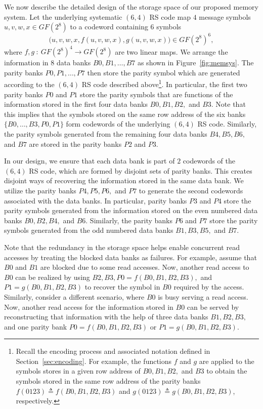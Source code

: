 We now describe the detailed design of the storage space of our proposed memory system. Let the underlying systematic $(6,4)$ RS code map $4$ message symbols $u, v, w, x \in GF(2^{8})$ to a codeword containing $6$ symbols 
$$
\big(u, v, w, x, f(u, v, w, x), g(u, v, w, x)\big) \in GF(2^{8})^6,
$$
where $f, g~:~GF(2^{8})^4 \to GF(2^{8})$ are two linear maps. We arrange the information in $8$ data banks $B0, B1, \ldots, B7$ as shown in Figure~\ref{fig:memsys}. The parity banks $P0, P1,\ldots, P7$ then store the parity symbol which are generated according to the $(6,4)$ RS code described above\footnote{Recall the encoding process and associated notation defined in Section~\ref{sec:encoding}. For example, the functions $f$ and $g$ are applied to the symbols stores in a given row address of $B0, B1, B2,$ and $B3$ to obtain the symbols stored in the same row address of the parity banks $f(0123) \triangleq f(B0,B1,B2,B3)$ and $g(0123) \triangleq g(B0, B1, B2, B3)$, respectively.}. In particular, the first two parity banks $P0$ and $P1$ store the parity symbols that are functions of the information stored in the first four data banks $B0, B1, B2,$ and $B3$. Note that this implies that the symbols stored on the same row address of the six banks $\{B0,\ldots, B3, P0,P1\}$ form codewords of the underlying $(6,4)$ RS code. Similarly, the parity symbols generated from the remaining four data banks $B4, B5, B6,$ and $B7$ are stored in the parity banks $P2$ and $P3$. 

In our design, we ensure that each data bank is part of $2$ codewords of the $(6,4)$ RS code, which are formed by disjoint sets of parity banks. This creates disjoint ways of recovering the information stored in the same data bank. We utilize the parity banks $P4, P5, P6,$ and $P7$ to generate the second codewords associated with the data banks. In particular, parity banks $P3$ and $P4$ store the parity symbols generated from the information stored on the even numbered data banks $B0, B2, B4,$ and $B6$. Similarly, the parity banks $P6$ and $P7$ store the parity symbols generated from the odd numbered data banks $B1, B3, B5,$ and $B7$. 

\begin{remark}
\label{rem:degraded}
Note that the redundancy in the storage space helps enable concurrent read accesses by treating the blocked data banks as failures. For example, assume that $B0$ and $B1$ are blocked due to some read accesses. Now, another read access to $B0$ can be realized by using $B2, B3, P0 = f(B0, B1, B2, B3),$ and $P1 = g(B0, B1, B2, B3)$ to recover the symbol in $B0$ required by the access. Similarly, consider a different scenario, where $B0$ is busy serving a read access. Now, another read access for the information stored in $B0$ can be served by reconstructing that information with the help of three data banks $B1, B2, B3,$ and one parity bank $P0 = f(B0, B1, B2, B3)$ or $P1 = g(B0, B1, B2, B3)$.
\end{remark}

